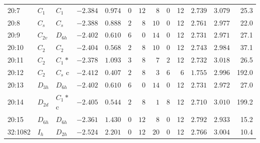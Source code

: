 \begin{table}[ht!]
{\begin{tabular}{lllrrrrrrrrrr}
20:7    & $C_1$    & $C_{1 }$  & $-2.384$ & $0.974$  & $0$ & $12$ & $8$  & $0$ & 12 & $2.739$ & $3.079$  &  25.3 \\
20:8    & $C_s$    & $C_{s }$  & $-2.388$ & $0.888$  & $2$ & $8$  & $10$ & $0$ & 12 & $2.761$ & $2.977$  &  22.0 \\
20:9    & $C_{2v}$ & $D_{6h}$  & $-2.402$ & $0.610$  & $6$ & $0$  & $14$ & $0$ & 12 & $2.731$ & $2.971$  &  27.1 \\
20:10   & $C_2$    & $C_{2 }$  & $-2.404$ & $0.568$  & $2$ & $8$  & $10$ & $0$ & 12 & $2.743$ & $2.984$  &  37.1 \\
20:11   & $C_2$    & $C_{1 }*$ & $-2.378$ & $1.093$  & $3$ & $8$  & $7$  & $2$ & 12 & $2.732$ & $3.018$  &  26.5 \\ %
20:12   & $C_2$    & $C_s$ c   & $-2.412$ & $0.407$  & $2$ & $8$  & $3$  & $6$ & 6  & $1.755$ & $2.996$  &  192.0\\
20:13   & $D_{3h}$ & $D_{6h}$  & $-2.402$ & $0.610$  & $6$ & $0$  & $14$ & $0$ & 12 & $2.731$ & $2.972$  &  27.0 \\
20:14   & $D_{2d}$ & $C_1*$ c  & $-2.405$ & $0.544$  & $2$ & $8$  & $1$  & $8$ & 12 & $2.710$ & $3.010$  &  199.2\\ %
20:15   & $D_{6h}$ & $D_{6h}$  & $-2.361$ & $1.430$  & $0$ & $12$ & $8$  & $0$ & 12 & $2.792$ & $2.933$  &  15.2 \\
32:1082 & $I_h$    & $D_{2h}$  & $-2.524$ & $2.201$  & $0$ & $12$ & $20$ & $0$ & 12 & $2.766$ & $3.004$  &  10.4     \\
		\bottomrule
\end{tabular}}
\end{table}

